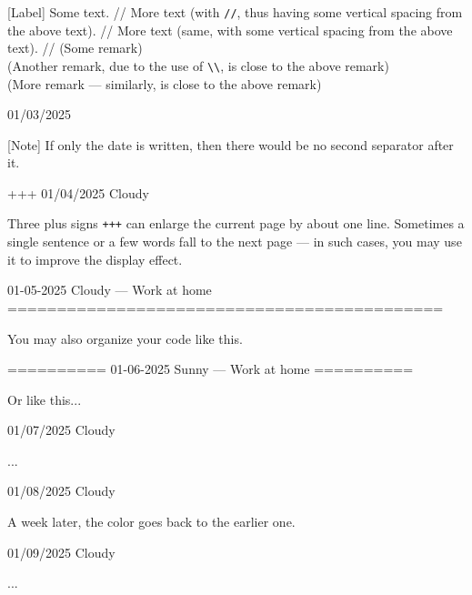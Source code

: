 \documentclass[11pt, paperstyle=light yellow, color entry, month-day-year,
  title in boldface, title in sffamily, use style = classical]{jwjournal}
\begin{document}
  [Label] Some text.
    //
    More text (with \texttt{\slash\slash}, thus having some vertical spacing from the above text).
    //
    More text (same, with some vertical spacing from the above text).
    //
    (Some remark)
    \\
    (Another remark, due to the use of \texttt{\textbackslash\textbackslash}, is close to the above remark)
    \\
    (More remark --- similarly, is close to the above remark)



01/03/2025

  [Note] If only the date is written, then there would be no second separator after it.


+++
01/04/2025  Cloudy

  Three plus signs \texttt{+++} can enlarge the current page by about one line. Sometimes a single sentence or a few words fall to the next page --- in such cases, you may use it to improve the display effect.



01-05-2025    Cloudy        --- Work at home
============================================

You may also organize your code like this.


==========
01-06-2025    Sunny         --- Work at home
==========

Or like this...



01/07/2025  Cloudy

  ...



01/08/2025  Cloudy

  A week later, the color goes back to the earlier one.



01/09/2025  Cloudy

  ...
\end{document}
